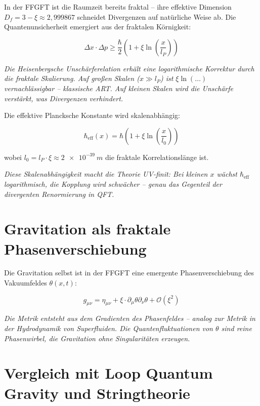 	In der FFGFT ist die Raumzeit bereits fraktal – ihre effektive Dimension \(D_f = 3 - \xi \approx 2{,}999867\) schneidet Divergenzen auf natürliche Weise ab. Die Quantenunsicherheit emergiert aus der fraktalen Körnigkeit:
	
	\begin{equation}
		\Delta x \cdot \Delta p \geq \frac{\hbar}{2} \left(1 + \xi \ln\left(\frac{x}{l_P}\right)\right)
	\end{equation}
	
	\textit{Die Heisenbergsche Unschärferelation erhält eine logarithmische Korrektur durch die fraktale Skalierung. Auf großen Skalen (\(x \gg l_P\)) ist \(\xi \ln(\ldots)\) vernachlässigbar – klassische ART. Auf kleinen Skalen wird die Unschärfe verstärkt, was Divergenzen verhindert.}
	
	Die effektive Plancksche Konstante wird skalenabhängig:
	
	\begin{equation}
		\hbar_{\text{eff}}(x) = \hbar \left(1 + \xi \ln\left(\frac{x}{l_0}\right)\right)
	\end{equation}
	
	wobei \(l_0 = l_P \cdot \xi \approx \SI{2e-39}{m}\) die fraktale Korrelationslänge ist.
	
	\textit{Diese Skalenabhängigkeit macht die Theorie UV-finit: Bei kleinen \(x\) wächst \(\hbar_{\text{eff}}\) logarithmisch, die Kopplung wird schwächer – genau das Gegenteil der divergenten Renormierung in QFT.}
	
	\section{Gravitation als fraktale Phasenverschiebung}
	
	Die Gravitation selbst ist in der FFGFT eine emergente Phasenverschiebung des Vakuumfeldes \(\theta(x,t)\):
	
	\begin{equation}
		g_{\mu\nu} = \eta_{\mu\nu} + \xi \cdot \partial_\mu \theta \partial_\nu \theta + \mathcal{O}(\xi^2)
	\end{equation}
	
	\textit{Die Metrik entsteht aus dem Gradienten des Phasenfeldes – analog zur Metrik in der Hydrodynamik von Superfluiden. Die Quantenfluktuationen von \(\theta\) sind reine Phasenwirbel, die Gravitation ohne Singularitäten erzeugen.}
	
	\section{Vergleich mit Loop Quantum Gravity und Stringtheorie}
	
